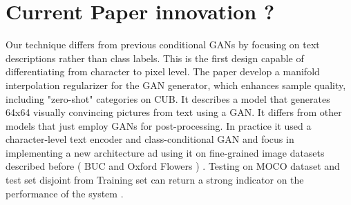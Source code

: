 
\section*{Current Paper innovation ? }
Our technique differs from previous conditional GANs by focusing on text descriptions rather than class labels. 
This is the first design capable of differentiating from character to pixel level. 
The paper develop a manifold interpolation regularizer for the GAN generator, 
which enhances sample quality, including "zero-shot" categories on CUB.
It describes a model that generates 64x64 visually convincing pictures from text using a GAN. 
It differs from other models that just employ GANs for post-processing.
In practice it used a character-level text encoder and class-conditional GAN and 
focus in implementing a new architecture ad using it on fine-grained  
image datasets described before ( BUC and Oxford Flowers ) .
Testing on MOCO dataset and test set disjoint from Training set 
can return a strong indicator on the performance of the system .
